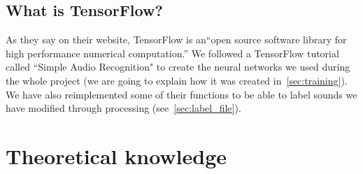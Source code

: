 \documentclass[11pt,a4paper,titlepage]{report}
\begin{document}
\section{What is TensorFlow?}
\hspace*{0.6cm}
As they say on their website, TensorFlow is an``open source software library for high performance numerical computation.'' We followed a TensorFlow tutorial called ``Simple Audio Recognition" to create the neural networks we used during the whole project (we are going to explain how it was created in~\ref{sec:training}). We have also reimplemented some of their functions to be able to label sounds we have modified through processing (see~\ref{sec:label_file}).
\chapter{Theoretical knowledge}
\end{document}
